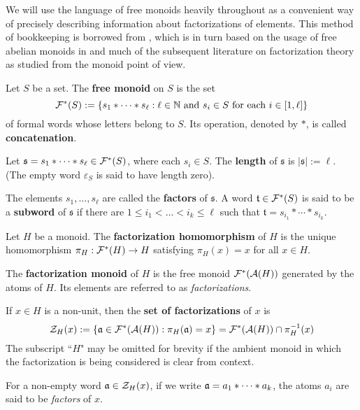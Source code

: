 We will use the language of free monoids heavily throughout as a convenient way of precisely describing information about factorizations of elements.  
This method of bookkeeping is borrowed from \cite{fan-tringali18}, which is in turn based on the usage of free abelian monoids in \cite{geroldinger-hk06} and much of the subsequent literature on factorization theory as studied from the monoid point of view.

\begin{defn} \label{def:free monoid}
Let $S$ be a set.
The \textbf{free monoid} on $S$ is the set
\[\F^*(S) := \{s_1*\cdots*s_\ell: \ell\in \NN \textrm{ and } s_i\in S \textrm{ for each } i\in [1,\ell] \} \]
of formal words whose letters belong to $S$.
Its operation, denoted by $*$, is called \textbf{concatenation}.

Let $\mathfrak{s}= s_1 * \cdots * s_\ell  \in \F^*(S)$, where each $s_i\in S$.
The \textbf{length} of $\mathfrak{s}$ is $| \mathfrak{s} | := \ell$.
(The empty word $\varepsilon_S$ is said to have length zero).

The elements $s_1,\dots,s_\ell$ are called the \textbf{factors} of $\mathfrak{s}$. 
A word $\mathfrak{t}\in \F^*(S)$ is said to be a \textbf{subword} of $\mathfrak{s}$ if there are $1\le i_1 < \dots < i_k \le \ell$ such that $\mathfrak{t} = s_{i_1}*\cdots*s_{i_k}$.
\end{defn}


\begin{defn} \label{def:factorization}
Let $H$ be a monoid.
The \textbf{factorization homomorphism} of $H$ is the unique homomorphism $\pi_H: \F^*(H) \to H$ satisfying $\pi_H(x) = x$ for all $x\in H$.

The \textbf{factorization monoid} of $H$ is the free monoid $\F^*(\A(H))$ generated by the atoms of $H$.
Its elements are referred to as \textit{factorizations}.

If $x\in H$ is a non-unit, then the \textbf{set of factorizations} of $x$ is
\[ \Z_H(x) := \{ \aa\in \F^*(\A(H)) : \pi_H(\aa) = x \} = \F^*(\A(H)) \cap \pi_H^{-1}(x) \]
The subscript ``$H$" may be omitted for brevity if the ambient monoid in which the factorization is being considered is clear from context.

For a non-empty word $\aa\in \Z_H(x)$, if we write $\aa = a_1*\cdots*a_k$, the atoms $a_i$ are said to be \textit{factors} of $x$.
\end{defn}

